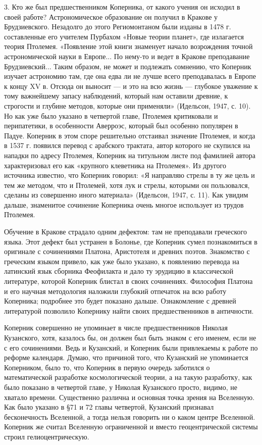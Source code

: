 3. Кто же был предшественником Коперника, от какого учения он исходил
в своей работе? Астрономическое образование он получил в Кракове у
Брудзиевского. Незадолго до этого Региомонтаном были изданы в 1478 г.
составленные его учителем Пурбахом «Новые теории планет», где
излагается теория Птолемея. «Появление этой книги знаменует начало
возрождения точной астрономической науки в Европе... По нему-то и
ведет в Кракове преподавание Брудзиевский... Таким образом, не может и
подлежать сомнению, что Коперник изучает астрономию там, где она едва
ли не лучше всего преподавалась в Европе к концу XV в. Отсюда он
выносит --- и это на всю жизнь --- глубокое уважение к тому важнейшему
запасу наблюдений, который нам оставили древние, к строгости и глубине
методов, которые они применяли» (Идельсон, 1947, с. 10). Но как уже
было указано в четвертой главе, Птолемея критиковали и перипатетики, в
особенности Аверроэс, который был особенно популярен в Падуе. Коперник
в этом споре решительно отстаивал значение Птолемея, и когда в 1537 г.
появился перевод с арабского трактата, автор которого не скупился на
нападки по адресу Птолемея, Коперник на титульном листе под фамилией
автора характеризовал его как «крупного клеветника на Птолемея». Из
другого источника известно, что Коперник говорил: «Я направляю стрелы
в ту же цель и тем же методом, что и Птолемей, хотя лук и стрелы,
которыми он пользовался, сделаны из совершенно иного материала»
(Идельсон, 1947, с. 11). Как увидим дальше, знаменитое сочинение
Коперника очень многое использует из трудов Птолемея.

Обучение в Кракове страдало одним дефектом: там не преподавали
греческого языка. Этот дефект был устранен в Болонье, где Коперник
сумел познакомиться в оригинале с сочинениями Платона, Аристотеля и
древних поэтов. Знакомство с греческим языком привело, как уже было
указано, к появлению перевода на латинский язык сборника Феофилакта и
дало ту эрудицию в классической литературе, которой Коперник блистал в
своих сочинениях. Философия Платона и его научная методология наложили
глубокий отпечаток на всю работу Коперника; подробнее это будет
показано дальше. Ознакомление с древней литературой позволило
Копернику найти своих предшественников в античности.

Коперник совершенно не упоминает в числе предшественников Николая
Кузанского, хотя, казалось бы, он должен был быть знаком с его именем,
если не с его сочинениями. Ведь и Кузанский, и Коперник были
привлекаемы к работе по реформе календаря. Думаю, что причиной того,
что Кузанский не упоминается Коперником, было то, что Коперник в
первую очередь заботился о математической разработке космологической
теории, а на такую разработку, как было показано в четвертой главе, у
Николая Кузанского просто, видимо, не хватало времени. Существенно
различна и основная точка зрения на Вселенную. Как было указано в §71
и 72 главы четвертой, Кузанский признавал бесконечность Вселенной, а
тогда нельзя говорить ни о каком центре Вселенной. Коперник же считал
Вселенную ограниченной и вместо геоцентрической системы строил
гелиоцентрическую.

